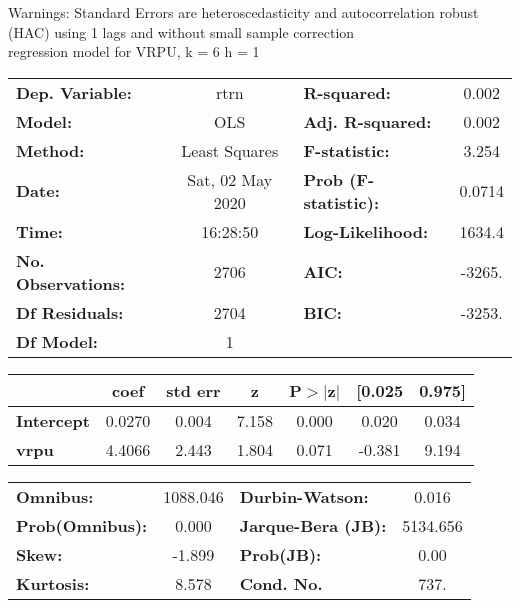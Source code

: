 Warnings: \newline
 [1] Standard Errors are heteroscedasticity and autocorrelation robust (HAC) using 1 lags and without small sample correction\\ 

regression model for VRPU, k = 6 h = 1\begin{center}
\begin{tabular}{lclc}
\toprule
\textbf{Dep. Variable:}    &       rtrn       & \textbf{  R-squared:         } &     0.002   \\
\textbf{Model:}            &       OLS        & \textbf{  Adj. R-squared:    } &     0.002   \\
\textbf{Method:}           &  Least Squares   & \textbf{  F-statistic:       } &     3.254   \\
\textbf{Date:}             & Sat, 02 May 2020 & \textbf{  Prob (F-statistic):} &   0.0714    \\
\textbf{Time:}             &     16:28:50     & \textbf{  Log-Likelihood:    } &    1634.4   \\
\textbf{No. Observations:} &        2706      & \textbf{  AIC:               } &    -3265.   \\
\textbf{Df Residuals:}     &        2704      & \textbf{  BIC:               } &    -3253.   \\
\textbf{Df Model:}         &           1      & \textbf{                     } &             \\
\bottomrule
\end{tabular}
\begin{tabular}{lcccccc}
                   & \textbf{coef} & \textbf{std err} & \textbf{z} & \textbf{P$> |$z$|$} & \textbf{[0.025} & \textbf{0.975]}  \\
\midrule
\textbf{Intercept} &       0.0270  &        0.004     &     7.158  &         0.000        &        0.020    &        0.034     \\
\textbf{vrpu}      &       4.4066  &        2.443     &     1.804  &         0.071        &       -0.381    &        9.194     \\
\bottomrule
\end{tabular}
\begin{tabular}{lclc}
\textbf{Omnibus:}       & 1088.046 & \textbf{  Durbin-Watson:     } &    0.016  \\
\textbf{Prob(Omnibus):} &   0.000  & \textbf{  Jarque-Bera (JB):  } & 5134.656  \\
\textbf{Skew:}          &  -1.899  & \textbf{  Prob(JB):          } &     0.00  \\
\textbf{Kurtosis:}      &   8.578  & \textbf{  Cond. No.          } &     737.  \\
\bottomrule
\end{tabular}
\end{center}

